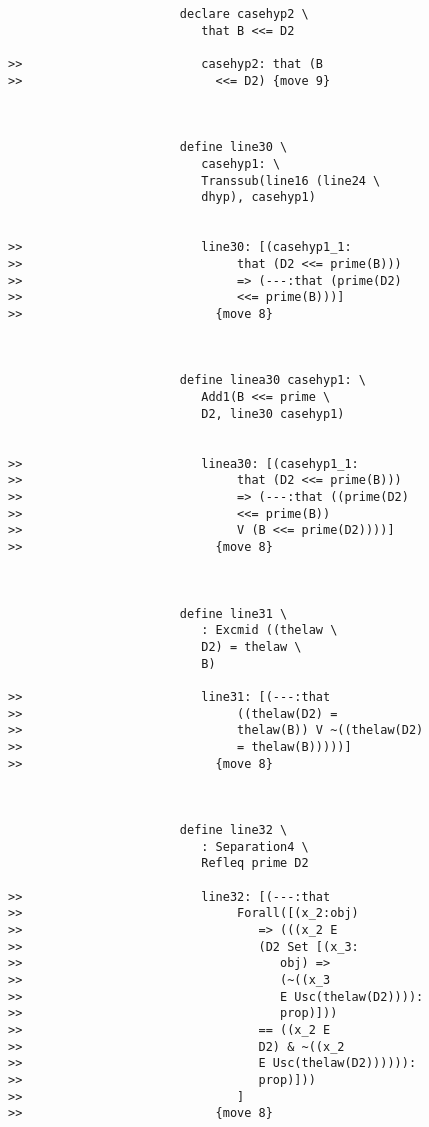 \documentclass[12pt]{article}
\begin{document}
\begin{verbatim}
                        declare casehyp2 \
                           that B <<= D2

>>                         casehyp2: that (B
>>                           <<= D2) {move 9}



                        define line30 \
                           casehyp1: \
                           Transsub(line16 (line24 \
                           dhyp), casehyp1)


>>                         line30: [(casehyp1_1:
>>                              that (D2 <<= prime(B)))
>>                              => (---:that (prime(D2)
>>                              <<= prime(B)))]
>>                           {move 8}



                        define linea30 casehyp1: \
                           Add1(B <<= prime \
                           D2, line30 casehyp1)


>>                         linea30: [(casehyp1_1:
>>                              that (D2 <<= prime(B)))
>>                              => (---:that ((prime(D2)
>>                              <<= prime(B))
>>                              V (B <<= prime(D2))))]
>>                           {move 8}



                        define line31 \
                           : Excmid ((thelaw \
                           D2) = thelaw \
                           B)

>>                         line31: [(---:that
>>                              ((thelaw(D2) =
>>                              thelaw(B)) V ~((thelaw(D2)
>>                              = thelaw(B)))))]
>>                           {move 8}



                        define line32 \
                           : Separation4 \
                           Refleq prime D2

>>                         line32: [(---:that
>>                              Forall([(x_2:obj)
>>                                 => (((x_2 E
>>                                 (D2 Set [(x_3:
>>                                    obj) =>
>>                                    (~((x_3
>>                                    E Usc(thelaw(D2)))):
>>                                    prop)]))
>>                                 == ((x_2 E
>>                                 D2) & ~((x_2
>>                                 E Usc(thelaw(D2)))))):
>>                                 prop)]))
>>                              ]
>>                           {move 8}




\end{verbatim}
\end{document}
